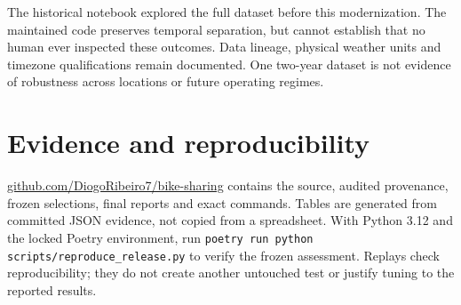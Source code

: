 \documentclass[11pt,a4paper]{article}
\begin{document}
The historical notebook explored the full dataset before this modernization.
The maintained code preserves temporal separation, but cannot establish that no
human ever inspected these outcomes. Data lineage, physical weather units and
timezone qualifications remain documented. One two-year dataset is not evidence
of robustness across locations or future operating regimes.

\section*{Evidence and reproducibility}
\href{https://github.com/DiogoRibeiro7/bike-sharing}{github.com/DiogoRibeiro7/bike-sharing}
contains the source, audited provenance, frozen selections, final reports and
exact commands. Tables are generated from committed JSON evidence, not copied
from a spreadsheet. With Python 3.12 and the locked Poetry environment, run
\texttt{poetry run python scripts/reproduce\_release.py} to verify the frozen
assessment. Replays check reproducibility; they do not create another untouched
test or justify tuning to the reported results.
\end{document}
